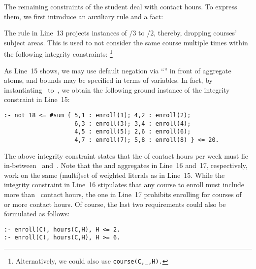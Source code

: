 \begin{example}
The remaining constraints of the student deal with contact hours.
To express them, we first introduce an auxiliary rule and a fact:
%

%
The rule in Line~13 projects instances of /$3$ to
/$2$, thereby, dropping courses' subject areas.
This is used to not consider the same course multiple times within the following
integrity constraints:
\footnote{Alternatively, we could also use \lstinline{course(C,_,H).}}
%

%
As Line~15 shows,
we may use default negation via ``'' in front of aggregate atoms,
and bounds may be specified in terms of variables.
In fact, by instantiating~ to~,
we obtain the following ground instance of the integrity constraint in Line~15:
%
\begin{lstlisting}[firstnumber=15,stepnumber=15]
:- not 18 <= #sum { 5,1 : enroll(1); 4,2 : enroll(2);
                    6,3 : enroll(3); 3,4 : enroll(4);
                    4,5 : enroll(5); 2,6 : enroll(6);
                    4,7 : enroll(7); 5,8 : enroll(8) } <= 20.
\end{lstlisting}
%
The above integrity constraint states that the  of contact hours per week
must lie in-between~ and~.
Note that the  and  aggregates in Line~16 and~17, respectively,
work on the same (multi)set of weighted literals as in Line~15.
While the integrity constraint in Line~16 stipulates that any course to enroll
must include more than~ contact hours,
the one in Line~17 prohibits enrolling for courses of~ or more contact hours.
Of course, the last two requirements could also be formulated as follows:
%
\begin{lstlisting}[firstnumber=16]
:- enroll(C), hours(C,H), H <= 2.
:- enroll(C), hours(C,H), H >= 6.
\end{lstlisting}


\end{example}
